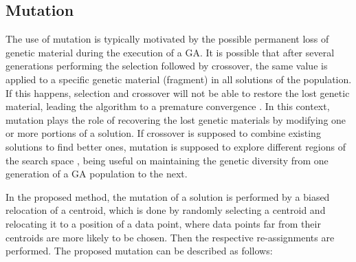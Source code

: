 


\subsection{Mutation}
\label{subsec:mutation}
The use of mutation is typically motivated by the possible permanent loss of genetic material during the execution of a GA. It is possible that after several generations performing the selection followed by crossover, the same value is applied to a specific genetic material (fragment) in all solutions of the population. If this happens, selection and crossover will not be able to restore the lost genetic material, leading the algorithm to a premature convergence \cite{Whitley1994}. In this context, mutation plays the role of recovering the lost genetic materials by modifying one or more portions of a solution. If crossover is supposed to combine existing solutions to find better ones, mutation is supposed to explore different regions of the search space \cite{Abdoun2012}, being useful on maintaining the genetic diversity from one generation of a GA population to the next.

In the proposed method, the mutation of a solution is performed by a biased relocation of a centroid, which is done by randomly selecting a centroid and relocating it to a position of a data point, where data points far from their centroids are more likely to be chosen. Then the respective re-assignments are performed. The proposed mutation can be described as follows:

